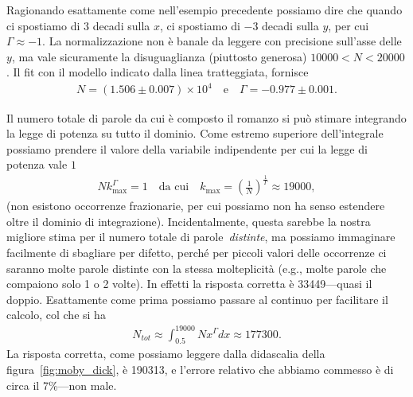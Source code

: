
Ragionando esattamente come nell'esempio precedente possiamo dire che
quando ci spostiamo di $3$ decadi sulla $x$, ci spostiamo di $-3$ decadi sulla
$y$, per cui $\Gamma \approx -1$. La normalizzazione non è banale da leggere
con precisione sull'asse delle $y$, ma vale sicuramente la disuguaglianza
(piuttosto generosa) $10000 < N < 20000$. Il fit con il modello indicato dalla
linea tratteggiata, fornisce
\begin{align*}
  N = (1.506 \pm 0.007) \times 10^4 \quad \text{e} \quad \Gamma = -0.977 \pm 0.001.
\end{align*}

Il numero totale di parole da cui è composto il romanzo si può stimare
integrando la legge di potenza su tutto il dominio. Come estremo superiore
dell'integrale possiamo prendere il valore della variabile indipendente per cui
la legge di potenza vale $1$
\begin{align*}
  N k_{\text{max}}^\Gamma = 1 \quad \text{da cui} \quad k_{\text{max}} =
  \left(\frac{1}{N}\right)^{\frac{1}{\Gamma}} \approx 19000,
\end{align*}
(non esistono occorrenze frazionarie, per cui possiamo non ha senso estendere
oltre il dominio di integrazione). Incidentalmente, questa sarebbe la nostra
migliore stima per il numero totale di parole~\emph{distinte}, ma possiamo
immaginare facilmente di sbagliare per difetto, perché per piccoli valori delle
occorrenze ci saranno molte parole distinte con la stessa molteplicità (e.g.,
molte parole che compaiono solo 1 o 2 volte). In effetti la risposta corretta
è 33449---quasi il doppio.
Esattamente come prima possiamo passare al continuo per facilitare il calcolo,
col che si ha
\begin{align*}
  N_{tot} \approx \int_{0.5}^{19000} N x^\Gamma dx \approx 177300.
\end{align*}
La risposta corretta, come possiamo leggere dalla didascalia della
figura~\ref{fig:moby_dick}, è 190313, e l'errore relativo che abbiamo commesso
è di circa il 7\%---non male.

